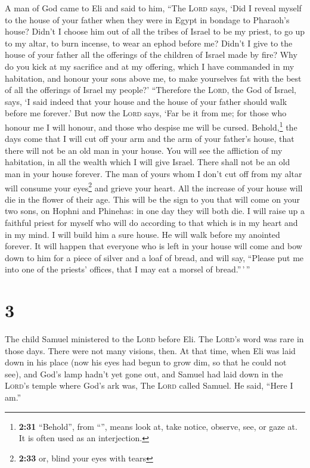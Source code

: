  A man of God came to Eli and said to him, ``The
\textsc{Lord} says, `Did I reveal myself to the house of your father
when they were in Egypt in bondage to Pharaoh's house? 
Didn't I choose him out of all the tribes of Israel to be my priest, to
go up to my altar, to burn incense, to wear an ephod before me? Didn't I
give to the house of your father all the offerings of the children of
Israel made by fire?  Why do you kick at my sacrifice and
at my offering, which I have commanded in my habitation, and honour your
sons above me, to make yourselves fat with the best of all the offerings
of Israel my people?'  ``Therefore the \textsc{Lord}, the
God of Israel, says, `I said indeed that your house and the house of
your father should walk before me forever.' But now the \textsc{Lord}
says, `Far be it from me; for those who honour me I will honour, and
those who despise me will be cursed.  Behold,\footnote{\textbf{2:31}
  ``Behold'', from ``'', means look at, take notice,
  observe, see, or gaze at. It is often used as an interjection.} the
days come that I will cut off your arm and the arm of your father's
house, that there will not be an old man in your house. 
You will see the affliction of my habitation, in all the wealth which I
will give Israel. There shall not be an old man in your house forever.
 The man of yours whom I don't cut off from my altar will
consume your eyes\footnote{\textbf{2:33} or, blind your eyes with tears}
and grieve your heart. All the increase of your house will die in the
flower of their age.  This will be the sign to you that
will come on your two sons, on Hophni and Phinehas: in one day they will
both die.  I will raise up a faithful priest for myself
who will do according to that which is in my heart and in my mind. I
will build him a sure house. He will walk before my anointed forever.
 It will happen that everyone who is left in your house
will come and bow down to him for a piece of silver and a loaf of bread,
and will say, ``Please put me into one of the priests' offices, that I
may eat a morsel of bread.''\,'\,''

\hypertarget{section-2}{%
\section{3}\label{section-2}}

 The child Samuel ministered to the \textsc{Lord} before
Eli. The \textsc{Lord}'s word was rare in those days. There were not
many visions, then.  At that time, when Eli was laid down
in his place (now his eyes had begun to grow dim, so that he could not
see),  and God's lamp hadn't yet gone out, and Samuel had
laid down in the \textsc{Lord}'s temple where God's ark was,
 The \textsc{Lord} called Samuel. He said, ``Here I am.''

